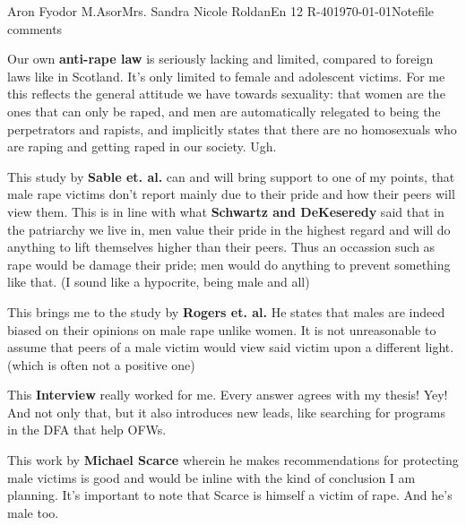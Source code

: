 \documentclass[12pt,letterpaper]{article}
\begin{document}
\begin{mla}{Aron Fyodor M.}{Asor}{Mrs. Sandra Nicole Roldan}{En 12 R-40}{\today}{Notefile comments}

	Our own \textbf{anti-rape law} is seriously lacking and limited, compared to foreign laws like in Scotland.
	It's only limited to female and adolescent victims. For me this reflects the general attitude we have towards
	sexuality: that women are the ones that can only be raped, and men are automatically relegated to being the
	perpetrators and rapists, and implicitly states that there are no homosexuals who are raping and getting
	raped in our society. Ugh.

	This study by \textbf{Sable et. al.} can and will bring support to one of my points, that male rape victims 
	don't report mainly due to their pride and how their peers will view them. This is in line with what 
	\textbf{Schwartz and DeKeseredy} said that in the patriarchy we live in, men value their pride in the highest
	regard and will do anything to lift themselves higher than their peers. Thus an occassion such as rape would
	be damage their pride; men would do anything to prevent something like that. (I sound like a hypocrite, being
	male and all)

	This brings me to the study by \textbf{Rogers et. al.} He states that males are indeed biased on their 
	opinions on male rape unlike women. It is not unreasonable to assume that peers of a male victim would view
	said victim upon a different light. (which is often not a positive one)

	This \textbf{Interview} really worked for me. Every answer agrees with my thesis! Yey! And not only that,
	but it also introduces new leads, like searching for programs in the DFA that help OFWs. 

	This work by \textbf{Michael Scarce} wherein he makes recommendations for protecting male victims is good and
	would be inline with the kind of conclusion I am planning. It's important to note that Scarce is himself a 
	victim of rape. And he's male too.
	

\end{mla}
\end{document}
